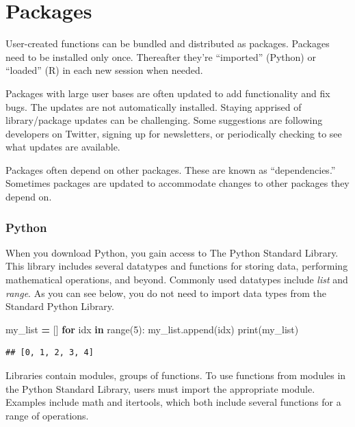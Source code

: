 \documentclass[
]{book}
\newenvironment{Shaded}{\begin{snugshade}}{\end{snugshade}}
\newcommand{\BuiltInTok}[1]{#1}
\newcommand{\ControlFlowTok}[1]{\textcolor[rgb]{0.13,0.29,0.53}{\textbf{#1}}}
\newcommand{\DecValTok}[1]{\textcolor[rgb]{0.00,0.00,0.81}{#1}}
\newcommand{\KeywordTok}[1]{\textcolor[rgb]{0.13,0.29,0.53}{\textbf{#1}}}
\newcommand{\NormalTok}[1]{#1}
\newcommand{\OperatorTok}[1]{\textcolor[rgb]{0.81,0.36,0.00}{\textbf{#1}}}
\begin{document}
\hypertarget{packages}{%
\section{Packages}\label{packages}}

User-created functions can be bundled and distributed as packages. Packages need to be installed only once. Thereafter they're ``imported'' (Python) or ``loaded'' (R) in each new session when needed.

Packages with large user bases are often updated to add functionality and fix bugs. The updates are not automatically installed. Staying apprised of library/package updates can be challenging. Some suggestions are following developers on Twitter, signing up for newsletters, or periodically checking to see what updates are available.

Packages often depend on other packages. These are known as ``dependencies.'' Sometimes packages are updated to accommodate changes to other packages they depend on.

\hypertarget{python-3}{%
\subsubsection*{Python}\label{python-3}}

When you download Python, you gain access to The Python Standard Library. This library includes several datatypes and functions for storing data, performing mathematical operations, and beyond. Commonly used datatypes include \emph{list} and \emph{range}. As you can see below, you do not need to import data types from the Standard Python Library.

\begin{Shaded}
\begin{Highlighting}[]
\NormalTok{my\_list }\OperatorTok{=}\NormalTok{ []}
\ControlFlowTok{for}\NormalTok{ idx }\KeywordTok{in} \BuiltInTok{range}\NormalTok{(}\DecValTok{5}\NormalTok{):}
\NormalTok{  my\_list.append(idx)}
\BuiltInTok{print}\NormalTok{(my\_list)}
\end{Highlighting}
\end{Shaded}

\begin{verbatim}
## [0, 1, 2, 3, 4]
\end{verbatim}

Libraries contain modules, groups of functions. To use functions from modules in the Python Standard Library, users must import the appropriate module. Examples include math and itertools, which both include several functions for a range of operations.
\end{document}
